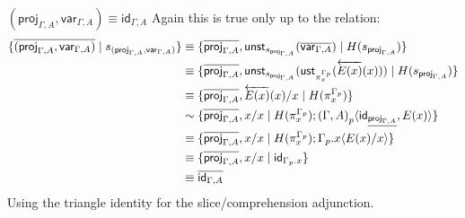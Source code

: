 \documentclass[10pt]{article}
\theoremstyle{definition}
\newcommand{\rewrite}[2]{\overleftarrow{#1}(#2)}
\newcommand\UStI[2]{\ensuremath{\mathsf{ust}_{#1}(#2)}}
\newcommand\UnSt[2]{\ensuremath{\mathsf{unst}_{#1}(#2)}}
\newcommand\proj[1]{\ensuremath{\mathsf{proj}_{#1}}}
\newcommand\var[1]{\ensuremath{\mathsf{var}_{#1}}}
\newcommand{\id}{\mathsf{id}}
\newcommand\ap[2]{\ensuremath{#1 \langle #2 \rangle }}
\begin{document}
\begin{enumerate}[style = multiline, labelwidth = 80pt]
\item[{$(\proj{\Gamma,A}, \var{\Gamma,A}) \equiv \id_{\Gamma, A}$}]  Again this is true only up to the relation:
\begin{align*}
\{ \upstairs{(\proj{\Gamma,A}, \var{\Gamma,A})} \mid s_{(\proj{\Gamma,A}, \var{\Gamma,A})} \}
&\equiv \{ \upstairs{\proj{\Gamma, A}} , \UnSt{s_{\proj{\Gamma, A}}}{\upstairs{\var{\Gamma, A}}} \mid H(s_{\proj{\Gamma,A}}) \} \\
&\equiv \{ \upstairs{\proj{\Gamma, A}} , \UnSt{s_{\proj{\Gamma, A}}}{\UStI{\pi^{\asdep{\Gamma}}_x}{\rewrite{E(x)}{x}}} \mid H(s_{\proj{\Gamma,A}}) \} \\
&\equiv \{ \upstairs{\proj{\Gamma, A}} , \rewrite{E(x)}{x} / x \mid H(\pi^{\asdep{\Gamma}}_x) \} \\
&\sim \{ \upstairs{\proj{\Gamma, A}} , x / x \mid H(\pi^{\asdep{\Gamma}}_x) ; \ap{\asdep{(\Gamma, A)}}{\id_{\downstairs{\proj{\Gamma, A}} }, E(x)} \} \\
&\equiv \{ \upstairs{\proj{\Gamma, A}} , x / x \mid H(\pi^{\asdep{\Gamma}}_x) ; \ap{\asdep{\Gamma}.x}{E(x)/x} \} \\
&\equiv \{ \upstairs{\proj{\Gamma, A}} , x / x \mid \id_{\asdep{\Gamma}.x} \} \\
&\equiv \upstairs{\id_{\Gamma, A}}
\end{align*}
Using the triangle identity for the slice/comprehension adjunction.
\end{enumerate}
\end{document}
